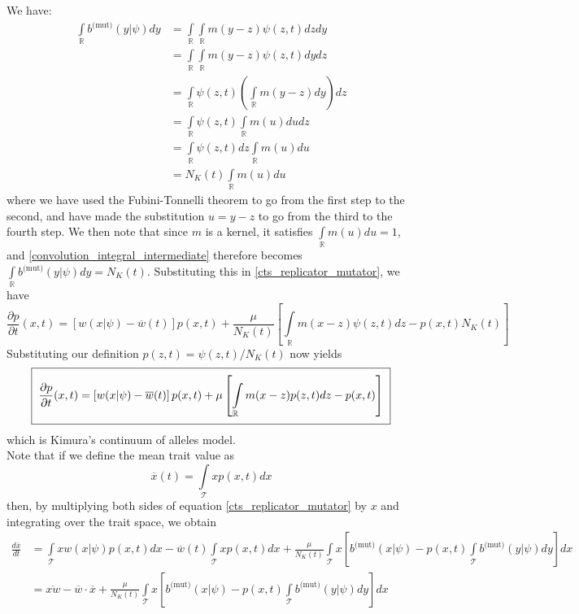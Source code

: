 We have: 
\begin{align}
\int\limits_{\mathbb{R}} b^{\textrm{(mut)}}(y|\psi)dy &= \int\limits_{\mathbb{R}}\int\limits_{\mathbb{R}} m(y-z)\psi(z,t)dzdy\nonumber\\
&= \int\limits_{\mathbb{R}}\int\limits_{\mathbb{R}} m(y-z)\psi(z,t)dydz\nonumber\\
&= \int\limits_{\mathbb{R}}\psi(z,t)\left(\int\limits_{\mathbb{R}} m(y-z)dy\right)dz\nonumber\\
&= \int\limits_{\mathbb{R}}\psi(z,t)\int\limits_{\mathbb{R}} m(u)dudz\nonumber\\
&= \int\limits_{\mathbb{R}}\psi(z,t)dz\int\limits_{\mathbb{R}} m(u)du\nonumber\\
&= N_K(t)\int\limits_{\mathbb{R}} m(u)du\label{convolution_integral_intermediate}
\end{align}
where we have used the Fubini-Tonnelli theorem to go from the first step to the second, and have made the substitution $u = y-z$ to go from the third to the fourth step. We then note that since $m$ is a kernel, it satisfies $\int\limits_{\mathbb{R}} m(u)du = 1$, and \eqref{convolution_integral_intermediate} therefore becomes $\int\limits_{\mathbb{R}} b^{\textrm{(mut)}}(y|\psi)dy = N_K(t)$. Substituting this in \eqref{cts_replicator_mutator}, we have
\begin{equation*}
\frac{\partial p}{\partial t}(x,t) = \left[w(x|\psi) - \overline{w}(t)\right]p(x,t)+\frac{\mu}{N_K(t)}\left[\int\limits_{\mathbb{R}}m(x-z)\psi(z,t)dz - p(x,t)N_K(t)\right]
\end{equation*}
Substituting our definition $p(z,t) = \psi(z,t)/N_K(t)$ now yields
\begin{equation}
\setlength{\fboxsep}{2\fboxsep}\boxed{\frac{\partial p}{\partial t}(x,t) = \left[w(x|\psi) - \overline{w}(t)\right]p(x,t)+\mu\left[\int\limits_{\mathbb{R}}m(x-z)p(z,t)dz - p(x,t)\right]}\label{kimura_continuum_model}
\end{equation}
which is Kimura's continuum of alleles model.\\
Note that if we define the mean trait value as
\begin{equation*}
    \overline{x}(t) = \int\limits_{\mathcal{T}}xp(x,t)dx
\end{equation*}
then, by multiplying both sides of equation \eqref{cts_replicator_mutator} by $x$ and integrating over the trait space, we obtain
\begin{align}
\frac{d \overline{x}}{dt} &= \int\limits_{\mathcal{T}}xw(x|\psi)p(x,t)dx - \overline{w}(t)\int\limits_{\mathcal{T}}xp(x,t)dx+\frac{\mu}{N_K(t)}\int\limits_{\mathcal{T}}x\left[b^{\textrm{(mut)}}(x|\psi) - p(x,t)\int\limits_{\mathcal{T}} b^{\textrm{(mut)}}(y|\psi)dy\right]dx\nonumber\\
&= \overline{xw} - \overline{w}\cdot\overline{x} + \frac{\mu}{N_K(t)}\int\limits_{\mathcal{T}}x\left[b^{\textrm{(mut)}}(x|\psi) - p(x,t)\int\limits_{\mathcal{T}} b^{\textrm{(mut)}}(y|\psi)dy\right]dx\label{intermediate_for_cts_price}
\end{align}
